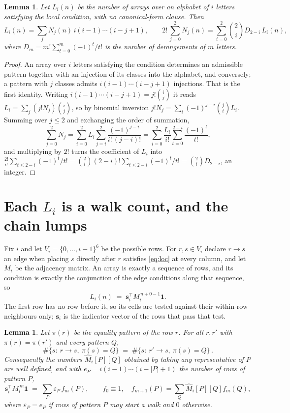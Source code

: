 \documentclass[11pt,a4paper]{article}
\theoremstyle{plain}
\newtheorem{lemma}[theorem]{Lemma}
\theoremstyle{definition}
\begin{document}
\begin{lemma}\label{lem:inv}
Let $L_i(n)$ be the number of arrays over an alphabet of $i$ letters satisfying the local
condition, with no canonical-form clause. Then
\[
L_i(n)=\sum_j N_j(n)\,i(i-1)\cdots(i-j+1),
\qquad
2!\,\sum_{j=0}^{2}N_j(n)=\sum_{i=0}^{2}\binom{2}{i}D_{2-i}\,L_i(n),
\]
where $D_m=m!\sum_{t=0}^{m}(-1)^t/t!$ is the number of derangements of $m$ letters.
\end{lemma}

\begin{proof}
An array over $i$ letters satisfying the condition determines an admissible pattern together
with an injection of its classes into the alphabet, and conversely; a pattern with $j$
classes admits $i(i-1)\cdots(i-j+1)$ injections. That is the first identity. Writing
$i(i-1)\cdots(i-j+1)=j!\binom{i}{j}$ it reads $L_i=\sum_j (j!N_j)\binom{i}{j}$, so by
binomial inversion $j!N_j=\sum_{i}(-1)^{j-i}\binom{j}{i}L_i$. Summing over
$j\le 2$ and exchanging the order of summation,
\[
\sum_{j=0}^{2}N_j=\sum_{i=0}^{2}L_i\sum_{j=i}^{2}\frac{(-1)^{j-i}}{i!\,(j-i)!}
=\sum_{i=0}^{2}\frac{L_i}{i!}\sum_{t=0}^{2-i}\frac{(-1)^t}{t!} ,
\]
and multiplying by $2!$ turns the coefficient of $L_i$ into
$\frac{2!}{i!}\sum_{t\le 2-i}(-1)^t/t!=\binom{2}{i}(2-i)!\sum_{t\le 2-i}(-1)^t/t!
=\binom{2}{i}D_{2-i}$, an integer.
\end{proof}

\section{Each $L_i$ is a walk count, and the chain lumps}

Fix $i$ and let $V_i=\{0,\dots,i-1\}^{6}$ be the possible rows. For $r,s\in V_i$
declare $r\to s$ an edge when placing $s$ directly after $r$ satisfies \eqref{eq:loc} at
every column, and let $M_i$ be the adjacency matrix. An array is exactly a sequence of
rows, and its condition is exactly the conjunction of the edge conditions along that
sequence, so
\[
L_i(n)\;=\;\mathbf{s}_i^{\!\top}M_i^{\,n+0-1}\mathbf{1} .
\]
The first row has no row before it, so its cells are tested
against their within-row neighbours only; $\mathbf{s}_i$ is the indicator vector of the
rows that pass that test.

\begin{lemma}\label{lem:lump}
Let $\pi(r)$ be the equality pattern of the row $r$. For all $r,r'$ with
$\pi(r)=\pi(r')$ and every pattern $Q$,
\[
\#\{s:\ r\to s,\ \pi(s)=Q\}\;=\;\#\{s:\ r'\to s,\ \pi(s)=Q\}\, .
\]
Consequently the numbers $\widehat M_i[P][Q]$ obtained by taking any representative of $P$
are well defined, and with $e_P=i(i-1)\cdots(i-|P|+1)$ the number of rows of pattern $P$,
\[
\mathbf{s}_i^{\!\top}M_i^{\,m}\mathbf{1}\;=\;\sum_P \varepsilon_P\,f_m(P),
\qquad f_0\equiv1,\quad f_{m+1}(P)=\sum_Q\widehat M_i[P][Q]f_m(Q),
\]
where $\varepsilon_P=e_P$ if rows of pattern $P$ may start a walk and $0$ otherwise.
\end{lemma}
\end{document}
